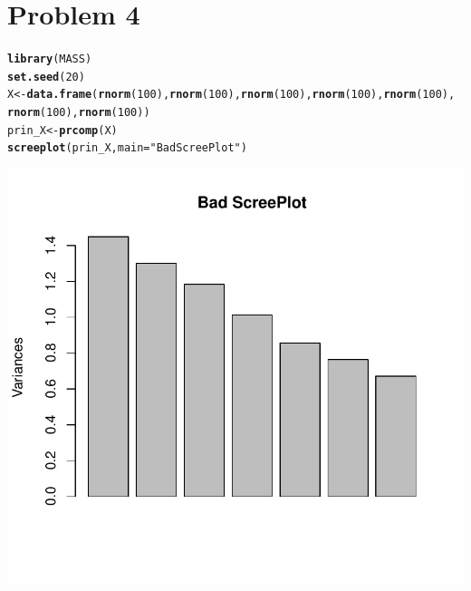 \documentclass{article}\usepackage[]{graphicx}\usepackage[]{color}
\makeatletter
\def\maxwidth{ %
  \ifdim\Gin@nat@width>\linewidth
    \linewidth
  \else
    \Gin@nat@width
  \fi
}
\newcommand{\hlnum}[1]{\textcolor[rgb]{0.686,0.059,0.569}{#1}}%
\newcommand{\hlstr}[1]{\textcolor[rgb]{0.192,0.494,0.8}{#1}}%
\newcommand{\hlstd}[1]{\textcolor[rgb]{0.345,0.345,0.345}{#1}}%
\newcommand{\hlkwb}[1]{\textcolor[rgb]{0.69,0.353,0.396}{#1}}%
\newcommand{\hlkwc}[1]{\textcolor[rgb]{0.333,0.667,0.333}{#1}}%
\newcommand{\hlkwd}[1]{\textcolor[rgb]{0.737,0.353,0.396}{\textbf{#1}}}%
\newenvironment{kframe}{%
 \def\at@end@of@kframe{}%
 \ifinner\ifhmode%
  \def\at@end@of@kframe{\end{minipage}}%
  \begin{minipage}{\columnwidth}%
 \fi\fi%
 \def\FrameCommand##1{\hskip\@totalleftmargin \hskip-\fboxsep
 \colorbox{shadecolor}{##1}\hskip-\fboxsep
     \hskip-\linewidth \hskip-\@totalleftmargin \hskip\columnwidth}%
 \MakeFramed {\advance\hsize-\width
   \@totalleftmargin\z@ \linewidth\hsize
   \@setminipage}}%
 {\par\unskip\endMakeFramed%
 \at@end@of@kframe}
\newenvironment{knitrout}{}{} %
\makeatother
\begin{document}
\section*{Problem 4}
\begin{knitrout}
\color{fgcolor}\begin{kframe}
\begin{alltt}
\hlkwd{library}\hlstd{(MASS)}
\hlkwd{set.seed}\hlstd{(}\hlnum{20}\hlstd{)}
\hlstd{X} \hlkwb{<-} \hlkwd{data.frame}\hlstd{(}\hlkwd{rnorm}\hlstd{(}\hlnum{100}\hlstd{),} \hlkwd{rnorm}\hlstd{(}\hlnum{100}\hlstd{),} \hlkwd{rnorm}\hlstd{(}\hlnum{100}\hlstd{),} \hlkwd{rnorm}\hlstd{(}\hlnum{100}\hlstd{),} \hlkwd{rnorm}\hlstd{(}\hlnum{100}\hlstd{),}
    \hlkwd{rnorm}\hlstd{(}\hlnum{100}\hlstd{),} \hlkwd{rnorm}\hlstd{(}\hlnum{100}\hlstd{))}
\hlstd{prin_X} \hlkwb{<-} \hlkwd{prcomp}\hlstd{(X)}
\hlkwd{screeplot}\hlstd{(prin_X,} \hlkwc{main} \hlstd{=} \hlstr{"Bad ScreePlot"}\hlstd{)}
\end{alltt}
\end{kframe}

{\centering \includegraphics[width=\maxwidth]{figure/minimal-Problem_41} 

}



\end{knitrout}
\end{document}
